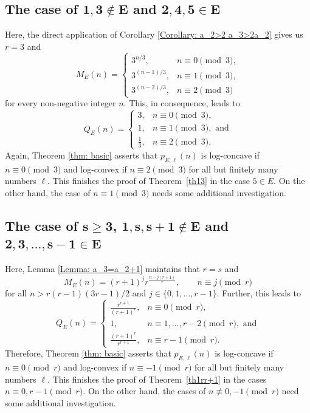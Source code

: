 \documentclass[12pt]{amsart}
\theoremstyle{definition}
\theoremstyle{remark}
\numberwithin{theorem}{section} \numberwithin{equation}{section}
\begin{document}
\subsection{The case of $\mathbf{1,3 \not\in E}$ and $\mathbf{2,4,5\in E}$}\label{subsection S=(1,3)}
Here, the direct application of Corollary \ref{Corollary: a_2>2 a_3>2a_2} gives us $r=3$ and
\begin{equation}
M_{E}\left( n\right) =\left\{
\begin{array}{ll}
3^{n/3}, & n\equiv 0\pmod{3}, \\
3^{(n-1)/3}, & n\equiv 1\pmod{3}, \\
3^{(n-2)/3}, & n\equiv 2\pmod{3}
\end{array}
\right.
\end{equation}
for every non-negative integer $n$.
This, in consequence, leads to 
\begin{equation*}
Q_{E}\left( n\right) =\left\{
\begin{array}{ll}
3, & n\equiv 0\pmod{3}, \\
1, & n\equiv 1\pmod{3},\text{ and} \\
\frac{1}{3}, & n\equiv 2\pmod{3}.
\end{array}
\right.
\end{equation*}
Again, Theorem \ref{thm: basic} asserts that $p_{E,\ell }(n)$ is log-concave if $n\equiv0\pmod{3}$ and log-convex if $n\equiv2\pmod{3}$ for all but finitely many numbers $\ell$.
This finishes the proof of
Theorem~\ref{th13} in the case
$5\in E$.
On the other hand, the case of $n\equiv 1 \pmod{3}$ needs some additional investigation.




\subsection{The case of $\mathbf{s\geq3}$, $\mathbf{1,s,s+1 \not\in E}$ and $\mathbf{2,3,\ldots,s-1 \in E}$}\label{subsection S=(1,r,r+1)}
Here, Lemma \ref{Lemma: a_3=a_2+1} maintains that $r=s$ and
\begin{equation*}
M_{E}\left( n\right)
=
\left( r+1\right) ^{j}r^{\frac{n-j(r+1)}{r}},\qquad n\equiv j\pmod{r}
\end{equation*}
for all $n>r(r-1)(3r-1)/2$ and $j\in\{0,1,\ldots,r-1\}$. Further, this leads to 
\begin{equation*}
Q_{E}\left( n\right) =\left\{
\begin{array}{ll}
\frac{r^{r+1}}{(r+1)^r}, & n\equiv 0\pmod{r}, \\
1, & n\equiv 1,\ldots ,r-2\pmod{r}, \text{ and} \\
\frac{(r+1)^{r}}{r^{r+1}}, & n\equiv r-1\pmod{r}.
\end{array}
\right.
\end{equation*}
Therefore, Theorem \ref{thm: basic} asserts that $p_{E,\ell }(n)$ is log-concave if $n\equiv0\pmod{r}$ and log-convex if $n\equiv -1\pmod{r}$ for all but finitely many numbers $\ell$.
This finishes the proof of
Theorem~\ref{th1rr+1} in the cases
$n\equiv 0,r-1\pmod{r}$.
On the other hand, the cases of $n\not\equiv 0,-1 \pmod{r}$ need some additional investigation.
\end{document}

